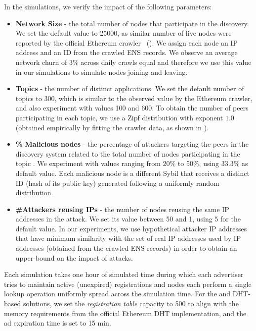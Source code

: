 In the simulations, we verify the impact of the following parameters:
 \begin{itemize}
     \item \textbf{Network Size} - the total number of nodes that participate in the discovery. We set the default value to 25000, as similar number of live nodes were reported by the official Ethereum crawler~\cite{discv4-dns-lists} (). We assign each node an IP address and an ID from the crawled ENS records.  We observe an average network churn of 3\% across daily crawls equal and therefore we use this value in our simulations to simulate nodes joining and leaving. 
     \item \textbf{Topics} - the number of distinct applications. We set the default number of topics to 300, which is similar to the observed value by the Ethereum crawler, and also experiment with values 100 and 600. To obtain the number of peers participating in each topic, we use a Zipf distribution with exponent $1.0$ (obtained empirically by fitting the crawler data, as shown in ). 
     \item \textbf{\% Malicious nodes} - the percentage of attackers targeting the peers in the discovery system related to the total number of nodes participating in the topic .  We experiment with values ranging from 20\% to 50\%,  using 33.3\% as default value.  Each malicious node is a different Sybil that receives a distinct ID (\ie hash of its public key) generated following a uniformly random distribution.
     \item \textbf{\#Attackers reusing IPs} - the number of nodes reusing the same IP addresses in the attack.  We set its value between 50 and 1, using 5 for the default value.  In our experiments, we use hypothetical attacker IP addresses that have minimum similarity with the set of real IP addresses used by IP addresses (obtained from the crawled ENS records) in order to obtain an upper-bound on the impact of attacks. %

 \end{itemize}


Each simulation takes one hour of simulated time during which each advertiser tries to maintain active (\ie unexpired) registrations and nodes each perform a single lookup operation uniformly spread across the simulation time.  For the \sysname and DHT-based solutions, we set the \emph{registration table} capacity to 500 to align with the memory requirements from the official Ethereum DHT implementation, and the ad expiration time is set to 15 min. %

